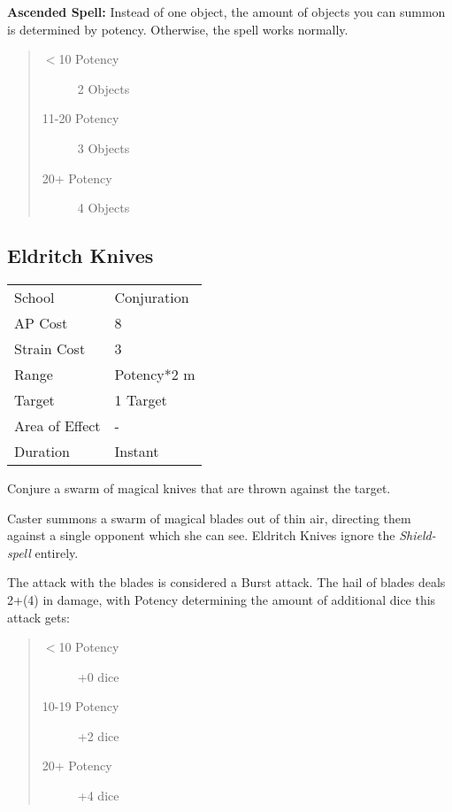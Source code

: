 \documentclass[11pt,a4paper,twocolumn]{book}
\begin{document}
\bigskip

\textbf{Ascended Spell:} Instead of one object, the amount of objects you can summon is determined by potency. Otherwise, the spell works normally.
\begin{quote}
	\begin{description}
		\item[$<$10 Potency] 	2 Objects
		\item[11-20 Potency] 	3 Objects
		\item[20+ Potency] 	    4 Objects
	\end{description}	
\end{quote}


\subsection*{Eldritch Knives}
{
	\begin{tabu} to 75mm{| X[l,4] | X[l,7] |}
		\hline
		School 			& Conjuration 			\\
		AP Cost	      	& 8 					\\
		Strain Cost     & 3 					\\
		Range     		& Potency*2 m 			\\
		Target      	& 1 Target				\\
		Area of Effect  & -  	 				\\
		Duration     	& Instant 				\\ \hline
	\end{tabu}
	
}

\medskip

Conjure a swarm of magical knives that are thrown against the target.

Caster summons a swarm of magical blades out of thin air, directing them against a single opponent which she can see. Eldritch Knives ignore the \textit{Shield-spell} entirely.

The attack with the blades is considered a Burst attack. The hail of blades deals 2+(4) in damage, with Potency determining the amount of additional dice this attack gets:

\begin{quote}
	\begin{description}
		\item[$<$10 Potency] 	+0 dice
		\item[10-19 Potency] 	+2 dice
		\item[20+ Potency] 	    +4 dice
	\end{description}
\end{quote}
\end{document}
